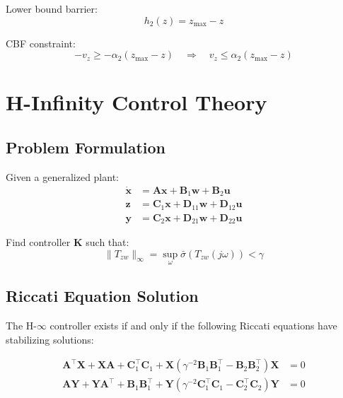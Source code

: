 Lower bound barrier:
\begin{equation}
    h_2(z) = z_{\max} - z
\end{equation}

CBF constraint:
\begin{equation}
    -v_z \geq -\alpha_2(z_{\max} - z) \quad \Rightarrow \quad v_z \leq \alpha_2(z_{\max} - z)
\end{equation}

\section{H-Infinity Control Theory}

\subsection{Problem Formulation}

Given a generalized plant:
\begin{align}
    \dot{\mathbf{x}} &= \mathbf{A}\mathbf{x} + \mathbf{B}_1\mathbf{w} + \mathbf{B}_2\mathbf{u} \\
    \mathbf{z} &= \mathbf{C}_1\mathbf{x} + \mathbf{D}_{11}\mathbf{w} + \mathbf{D}_{12}\mathbf{u} \\
    \mathbf{y} &= \mathbf{C}_2\mathbf{x} + \mathbf{D}_{21}\mathbf{w} + \mathbf{D}_{22}\mathbf{u}
\end{align}

Find controller $\mathbf{K}$ such that:
\begin{equation}
    \|T_{zw}\|_\infty = \sup_\omega \bar{\sigma}(T_{zw}(j\omega)) < \gamma
\end{equation}

\subsection{Riccati Equation Solution}

The H-$\infty$ controller exists if and only if the following Riccati equations have stabilizing solutions:

\begin{align}
    \mathbf{A}^\top\mathbf{X} + \mathbf{X}\mathbf{A} + \mathbf{C}_1^\top\mathbf{C}_1 +
    \mathbf{X}(\gamma^{-2}\mathbf{B}_1\mathbf{B}_1^\top - \mathbf{B}_2\mathbf{B}_2^\top)\mathbf{X} &= 0 \\
    \mathbf{A}\mathbf{Y} + \mathbf{Y}\mathbf{A}^\top + \mathbf{B}_1\mathbf{B}_1^\top +
    \mathbf{Y}(\gamma^{-2}\mathbf{C}_1^\top\mathbf{C}_1 - \mathbf{C}_2^\top\mathbf{C}_2)\mathbf{Y} &= 0
\end{align}

